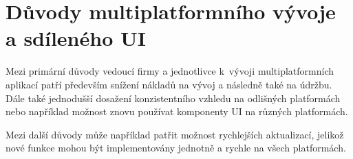 \section{Důvody multiplatformního vývoje a sdíleného UI}

Mezi primární důvody vedoucí firmy a jednotlivce k~vývoji multiplatformních aplikací patří především
snížení nákladů na vývoj a následně také na údržbu. Dále také jednodušší dosažení konzistentního vzhledu
na odlišných platformách nebo například možnost znovu používat komponenty UI na různých platformách.

Mezi další důvody může například patřit možnost rychlejších aktualizací, jelikož nové funkce mohou být 
implementovány jednotně a rychle na všech platformách. 

